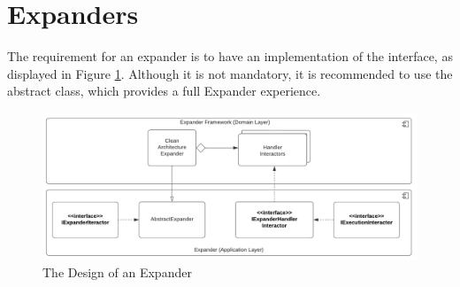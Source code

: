 \section{Expanders}
The requirement for an expander is to have an implementation of the
 interface, as displayed in Figure
\ref{fig_expander_design}. Although it is not mandatory, it is recommended to use the
abstract  class, which provides a full Expander
experience.

\begin{figure}[H]
    \centering
    \includegraphics[width=1\textwidth]{figures/expander.pdf}
    \caption[The Design of an Expander]{The Design of an Expander}
    \label{fig_expander_design}
  \end{figure}